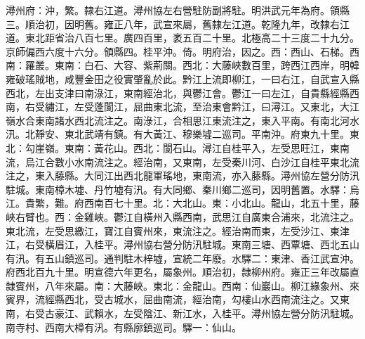 \begin{pinyinscope}
潯州府：沖，繁。隸右江道。潯州協左右營駐防副將駐。明洪武元年為府。領縣三。順治初，因明舊。雍正八年，武宣來屬，舊隸左江道。乾隆九年，改隸右江道。東北距省治八百七里。廣四百里，袤五百二十里。北極高二十三度二十九分。京師偏西六度十六分。領縣四。桂平沖。倚。明府治，因之。西：西山、石梯。西南：羅叢。東南：白石、大容、紫荊關。西北：大藤峽數百里，跨西江西岸，明韓雍破瑤賊地，咸豐金田之役實肇亂於此。黔江上流即柳江，一曰右江，自武宣入縣西北，左出支津曰南淥江，東南經治北，與鬱江會。鬱江一曰左江，自貴縣經縣西南，右受繡江，左受蓬閬江，屈曲東北流，至治東會黔江，曰潯江。又東北，大江嶺水合東南諸水西北流注之。南淥江，合相思江東流注之，東入平南。有南北河水汛。北靜安、東北武靖有鎮。有大黃江、穆樂墟二巡司。平南沖。府東九十里。東北：勾崖嶺。東南：黃花山。西北：閬石山。潯江自桂平入，左受思旺江，東南流，烏江合數小水南流注之。經治南，又東南，左受秦川河、白沙江自桂平東北流注之，東入藤縣。大同江出西北龍軍瑤地，東南流，亦入藤縣。潯州協左營分防汛駐城。東南樟木墟、丹竹墟有汛。有大同鄉、秦川鄉二巡司，因明舊置。水驛：烏江。貴繁，難。府西南百七十里。北：大北山。東：小北山。龍山，北五十里，藤峽右臂也。西：金雞峽。鬱江自橫州入縣西南，武思江自廣東合浦來，北流注之。東北流，左受思繳江，寶江自賓州來，東流注之。經治南而東，左受沙江、東津江，右受橫眉江，入桂平。潯州協右營分防汛駐城。東南三塘、西覃塘、西北五山有汛。有五山鎮巡司。通判駐木梓墟，宣統二年廢。水驛二：東津、香江武宣沖。府西北百九十里。明宣德六年更名，屬象州。順治初，隸柳州府。雍正三年改屬直隸賓州，八年來屬。南：大藤峽。東北：金龍山。西南：仙巖山。柳江緣象州、來賓界，流經縣西北，受古城水，屈曲南流，經治南，勾樓山水西南流注之。又東南，右受古豪江、武賴水，左受陰江、新江水，入桂平。潯州協左營分防汛駐城。南寺村、西南大樟有汛。有縣廓鎮巡司。驛一：仙山。


\end{pinyinscope}
